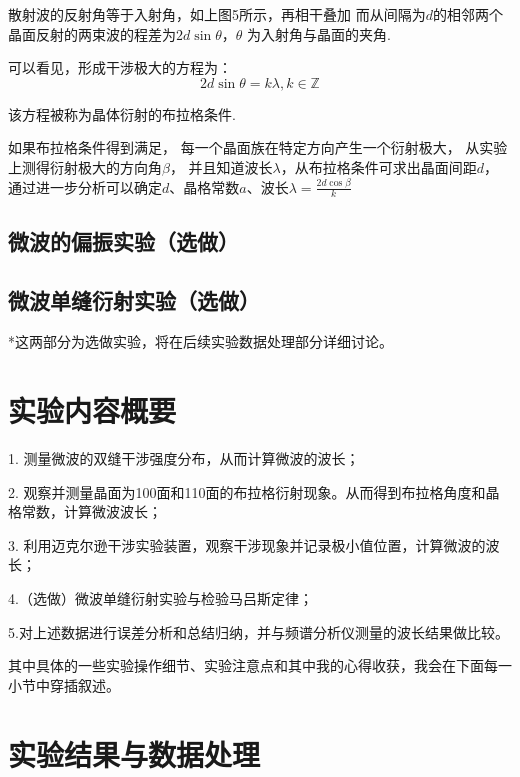\documentclass[11pt]{article}
\begin{document}
散射波的反射角等于入射角，如上图5所示，再相干叠加
而从间隔为$d$的相邻两个晶面反射的两束波的程差为$2d\sin \theta$，$\theta$
为入射角与晶面的夹角.

可以看见，形成干涉极大的方程为：
$$2d\sin \theta=k\lambda,k\in\mathbb{Z}$$

该方程被称为晶体衍射的布拉格条件.

如果布拉格条件得到满足，
每一个晶面族在特定方向产生一个衍射极大，
从实验上测得衍射极大的方向角$\beta$，
并且知道波长$\lambda$，从布拉格条件可求出晶面间距$d$，
通过进一步分析可以确定$d$、晶格常数$a$、波长$\displaystyle\lambda=\frac{2d\cos \beta}{k}$


\subsection{微波的偏振实验（选做）}



\subsection{微波单缝衍射实验（选做）}

*这两部分为选做实验，将在后续实验数据处理部分详细讨论。


\section{实验内容概要}

1. 测量微波的双缝干涉强度分布，从而计算微波的波长；

2. 观察并测量晶面为100面和110面的布拉格衍射现象。从而得到布拉格角度和晶格常数，计算微波波长；

3. 利用迈克尔逊干涉实验装置，观察干涉现象并记录极小值位置，计算微波的波长；

4.（选做）微波单缝衍射实验与检验马吕斯定律；

5.对上述数据进行误差分析和总结归纳，并与频谱分析仪测量的波长结果做比较。

\bigskip
其中具体的一些实验操作细节、实验注意点和其中我的心得收获，我会在下面每一小节中穿插叙述。

\newpage
\section{实验结果与数据处理}
\end{document}
